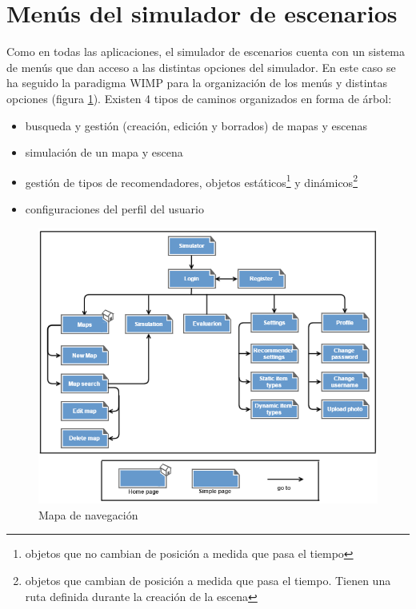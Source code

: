\section{Menús del simulador de escenarios}

Como en todas las aplicaciones, el simulador de escenarios cuenta con un sistema de menús que dan acceso a las distintas opciones del simulador. En este caso se ha seguido la paradigma WIMP para la organización de los menús y distintas opciones (figura \ref{mapaNavegacion}). Existen 4 tipos de caminos organizados en forma de árbol:

\begin{itemize}
	\item busqueda y gestión (creación, edición y borrados) de mapas y escenas
	\item simulación de un mapa y escena
	\item gestión de tipos de recomendadores, objetos estáticos\footnote{objetos que no cambian de posición a medida que pasa el tiempo} y dinámicos\footnote{objetos que cambian de posición a medida que pasa el tiempo. Tienen una ruta definida durante la creación de la escena}
	\item configuraciones del perfil del usuario
\end{itemize} 

\begin{figure}[H]
\centering\includegraphics[scale=0.7]{imagenes/mapa-navegacion.png}
\caption{Mapa de navegación}
\label{mapaNavegacion}
\end{figure}

